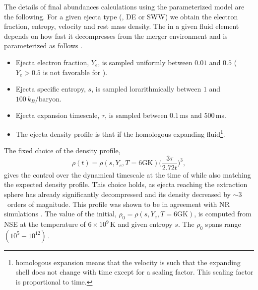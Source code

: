 The details of final abundances calculations using the parameterized model are the following. %
For a given ejecta type (\eg, \ac{DE} or \ac{SWW}) we obtain the electron fraction,
entropy, velocity and rest mass density.%
%
The \rproc{} in a given fluid element depends on how fast it decompresses from the 
merger environment and is parameterized as follows \citep{Lippuner:2015gwa}.
\begin{itemize}
    \setlength\itemsep{0.1em}
    \item Ejecta electron fraction, $Y_e$, is sampled uniformly between $0.01$ and $0.5$ 
    ($Y_e>0.5$ is not favorable for \rproc{}).
    \item Ejecta specific entropy, $s$, is sampled lorarithmically 
    between $1$ and $100\, k_B/\text{baryon}$.
    \item Ejecta expansion timescale, %
    $\tau$, is sampled between $0.1\,$ms and $500\,$ms.
    \item The ejecta density profile is that if the homologous expanding fluid\footnote{
        homologous expansion means that the velocity is such that the expanding shell 
        does not change with time except for a scaling factor. 
        This scaling factor is proportional to time.
    }.%
\end{itemize}
The fixed choice of the density profile,
\begin{equation}
\rho(t) = \rho(s, Y_e, T=6\text{GK})\Big(\frac{3\tau}{2.72 t}\Big)^3, 
\label{eq:nuc:rho_nuccalc}
\end{equation}
gives the control over the dynamical 
timescale at the time of \rproc{} while also matching the expected density profile.
%
This choice holds, as ejecta reaching the extraction sphere has already 
significantly decompressed and its density decreased by ${\sim}3$~orders of magnitude. 
%
This profile was shown to be in agreement with \ac{NR} simulations 
\citep{Lippuner:2015gwa,Foucart:2014nda}.
%
The value of the initial, 
$\rho_0 = \rho(s, Y_e, T=6\text{GK})$, 
is computed from \ac{NSE} 
at the temperature of $6\times10^9\,$K and given 
entropy $s$. The $\rho_0$ spans range $(10^5 - 10^{12})\,$\gcm.
%

